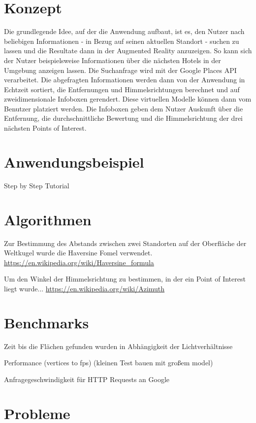 \section{Konzept}

Die grundlegende Idee, auf der die Anwendung aufbaut, ist es, den Nutzer nach beliebigen Informationen - in Bezug auf seinen aktuellen Standort - suchen zu lassen und die Resultate dann in der Augmented Reality anzuzeigen. So kann sich der Nutzer beispielsweise Informationen über die nächsten Hotels in der Umgebung anzeigen lassen. Die Suchanfrage wird mit der Google Places API verarbeitet. Die abgefragten Informationen werden dann von der Anwendung in Echtzeit sortiert, die Entfernungen und Himmelsrichtungen berechnet und auf zweidimensionale Infoboxen gerendert. Diese virtuellen Modelle können dann vom Benutzer platziert werden. Die Infoboxen geben dem Nutzer Auskunft über die Entfernung, die durchschnittliche Bewertung und die Himmelsrichtung der drei nächsten Points of Interest.

\section{Anwendungsbeispiel}

Step by Step Tutorial

\section{Algorithmen}

Zur Bestimmung des Abstands zwischen zwei Standorten auf der Oberfläche der Weltkugel wurde die Haversine Fomel verwendet.
\url{https://en.wikipedia.org/wiki/Haversine_formula}


Um den Winkel der Himmelsrichtung zu bestimmen, in der ein Point of Interest liegt wurde...
\url{https://en.wikipedia.org/wiki/Azimuth}

\section{Benchmarks}

Zeit bis die Flächen gefunden wurden in Abhängigkeit der Lichtverhältnisse

Performance (vertices to fps) (kleinen Test bauen mit großem model)

Anfragegeschwindigkeit für HTTP Requests an Google

\section{Probleme}

